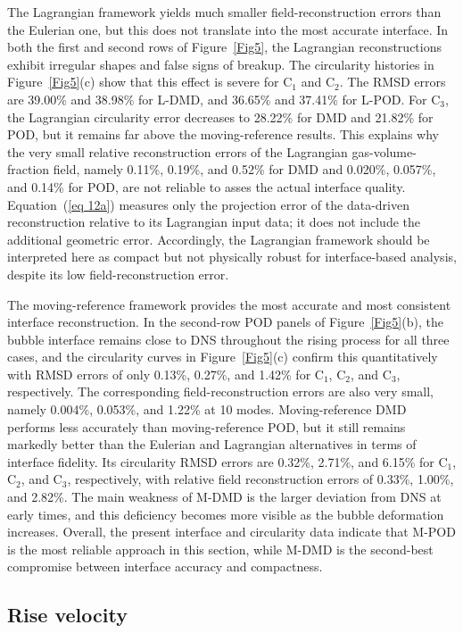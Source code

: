 \documentclass[a4paper,fleqn]{cas-sc}
\begin{document}
	The Lagrangian framework yields much smaller field-reconstruction errors than the Eulerian one, but this does not translate into the most accurate interface. In both the first and second rows of Figure~\ref{Fig5}, the Lagrangian reconstructions exhibit irregular shapes and false signs of breakup. The circularity histories in Figure~\ref{Fig5}(c) show that this effect is severe for C$_1$ and C$_2$. The RMSD errors are 39.00\% and 38.98\% for L-DMD, and 36.65\% and 37.41\% for L-POD. For C$_3$, the Lagrangian circularity error decreases to 28.22\% for DMD and 21.82\% for POD, but it remains far above the moving-reference results. This explains why the very small relative reconstruction errors of the Lagrangian gas-volume-fraction field, namely 0.11\%, 0.19\%, and 0.52\% for DMD and 0.020\%, 0.057\%, and 0.14\% for POD, are not reliable to asses the actual interface quality. Equation~(\ref{eq 12a}) measures only the projection error of the data-driven reconstruction relative to its Lagrangian input data; it does not include the additional geometric error. Accordingly, the Lagrangian framework should be interpreted here as compact but not physically robust for interface-based analysis, despite its low field-reconstruction error.
	
	The moving-reference framework provides the most accurate and most consistent interface reconstruction. In the second-row POD panels of Figure~\ref{Fig5}(b), the bubble interface remains close to DNS throughout the rising process for all three cases, and the circularity curves in Figure~\ref{Fig5}(c) confirm this quantitatively with RMSD errors of only 0.13\%, 0.27\%, and 1.42\% for C$_1$, C$_2$, and C$_3$, respectively. The corresponding field-reconstruction errors are also very small, namely 0.004\%, 0.053\%, and 1.22\% at 10 modes. Moving-reference DMD performs less accurately than moving-reference POD, but it still remains markedly better than the Eulerian and Lagrangian alternatives in terms of interface fidelity. Its circularity RMSD errors are 0.32\%, 2.71\%, and 6.15\% for C$_1$, C$_2$, and C$_3$, respectively, with relative field reconstruction errors of 0.33\%, 1.00\%, and 2.82\%. The main weakness of M-DMD is the larger deviation from DNS at early times, and this deficiency becomes more visible as the bubble deformation increases. Overall, the present interface and circularity data indicate that M-POD is the most reliable approach in this section, while M-DMD is the second-best compromise between interface accuracy and compactness.
	
	\subsection{Rise velocity}
	\label{Rise velocity}
	
\end{document}
